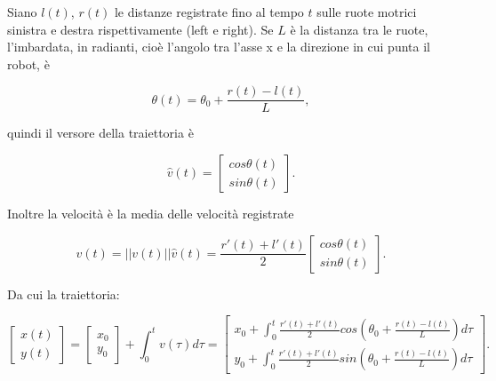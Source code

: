 \documentclass{article}
\begin{document}
\noindent
Siano $l(t)$, $r(t)$ le distanze registrate fino al tempo $t$ sulle
ruote motrici sinistra e destra rispettivamente (left e right). Se $L$ è la
distanza tra le ruote, l'imbardata, in radianti, cioè l'angolo tra l'asse x e
la direzione in cui punta il robot, è

\begin{equation}
	\theta (t) = \theta_0 + \frac{r(t)-l(t)}{L},
\end{equation}

\noindent
quindi il versore della traiettoria è

\begin{equation}
	\hat{v} (t) = \begin{bmatrix} cos\theta (t) \\ sin\theta (t) \end{bmatrix}.
\end{equation}

\noindent
Inoltre la velocità è la media delle velocità registrate

\begin{equation}
	v(t)=||v(t)||\hat{v}(t) = \frac{r'(t)+l'(t)}{2}\begin{bmatrix}cos\theta (t) \\
	sin\theta (t) \end{bmatrix}.
\end{equation}

\noindent
Da cui la traiettoria:

\begin{equation}
	\begin{bmatrix}x(t)\\ y(t) \end{bmatrix} = \begin{bmatrix}x_0 \\ y_0
	\end{bmatrix} +\int_0^t v(\tau )d\tau = \begin{bmatrix}x_0 + \int_0^t
	\frac{r'(t)+l'(t)}{2} cos(\theta_0 + \frac{r(t)-l(t)}{L})d\tau \\ y_0 +
	\int_0^t \frac{r'(t)+l'(t)}{2} sin(\theta_0 + \frac{r(t)-l(t)}{L})d\tau
	\end{bmatrix}.
\end{equation}
\end{document}
